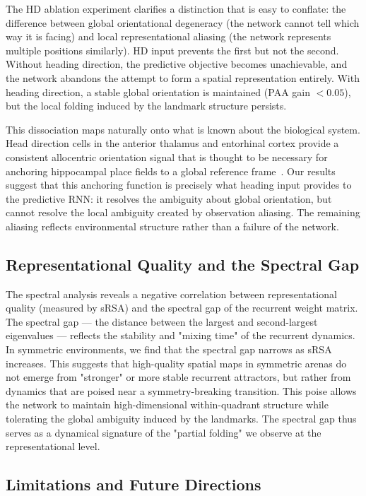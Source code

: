 \documentclass[11pt, a4paper]{article}
\begin{document}
The HD ablation experiment clarifies a distinction that is easy to
conflate: the difference between global orientational degeneracy (the
network cannot tell which way it is facing) and local representational
aliasing (the network represents multiple positions similarly). HD input
prevents the first but not the second. Without heading direction, the
predictive objective becomes unachievable, and the network abandons the
attempt to form a spatial representation entirely. With heading direction,
a stable global orientation is maintained (PAA gain $< 0.05$), but the
local folding induced by the landmark structure persists.

This dissociation maps naturally onto what is known about the biological
system. Head direction cells in the anterior thalamus and entorhinal cortex
provide a consistent allocentric orientation signal that is thought to be
necessary for anchoring hippocampal place fields to a global reference
frame~\citep{lever2002}. Our results suggest that this anchoring function
is precisely what heading input provides to the predictive RNN: it resolves
the ambiguity about global orientation, but cannot resolve the local
ambiguity created by observation aliasing. The remaining
aliasing reflects environmental structure rather than a failure of the
network.

\subsection{Representational Quality and the Spectral Gap}

The spectral analysis reveals a negative correlation between representational quality (measured by sRSA) and the spectral gap of the recurrent weight matrix. The spectral gap --- the distance between the largest and second-largest eigenvalues --- reflects the stability and "mixing time" of the recurrent dynamics. In symmetric environments, we find that the spectral gap narrows as sRSA increases. This suggests that high-quality spatial maps in symmetric arenas do not emerge from "stronger" or more stable recurrent attractors, but rather from dynamics that are poised near a symmetry-breaking transition. This poise allows the network to maintain high-dimensional within-quadrant structure while tolerating the global ambiguity induced by the landmarks. The spectral gap thus serves as a dynamical signature of the "partial folding" we observe at the representational level.

\subsection{Limitations and Future Directions}
\end{document}
